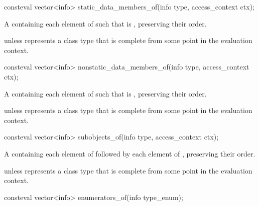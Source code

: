 %
\begin{itemdecl}
consteval vector<info> static_data_members_of(info type, access_context ctx);
\end{itemdecl}

\begin{itemdescr}
\pnum
\returns
A  containing each element  of 
such that  is ,
preserving their order.

\pnum
\throws
{} unless
 represents a class type
that is complete from some point in the evaluation context.
\end{itemdescr}


%
\begin{itemdecl}
consteval vector<info> nonstatic_data_members_of(info type, access_context ctx);
\end{itemdecl}

\begin{itemdescr}
\pnum
\returns
A  containing each element  of 
such that  is ,
preserving their order.

\pnum
\throws
{} unless
 represents a class type
that is complete from some point in the evaluation context.
\end{itemdescr}

%
\begin{itemdecl}
consteval vector<info> subobjects_of(info type, access_context ctx);
\end{itemdecl}

\begin{itemdescr}
\pnum
\returns
A  containing each element of 
followed by each element of ,
preserving their order.

\pnum
\throws
{} unless
 represents a class type
that is complete from some point in the evaluation context.
\end{itemdescr}

%
\begin{itemdecl}
consteval vector<info> enumerators_of(info type_enum);
\end{itemdecl}

